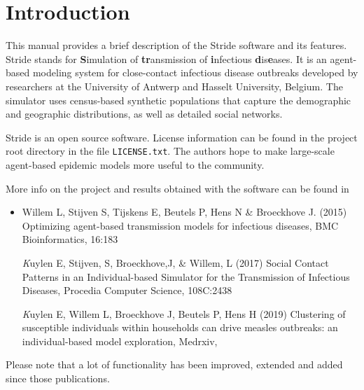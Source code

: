 \chapter{Introduction}
\label{chap:Introduction}
  
This manual provides a brief description of the Stride software and its
features. 
Stride stands for \textbf{S}imulation of \textbf{tr}ansmission 
 of \textbf{i}nfectious \textbf{d}is\textbf{e}ases. It is an agent-based modeling 
system for close-contact infectious disease outbreaks developed by researchers at the
University of Antwerp and Hasselt University, Belgium.
The simulator uses census-based synthetic populations
that capture the demographic and geographic distributions, as well as detailed social networks.

Stride is an open source software. License information can be found in the project root directory in the file \texttt{LICENSE.txt}. The authors hope to make large-scale
agent-based epidemic models more useful to the community.

More info on the project and results obtained with the software
can be found in
\begin{itemize}
\item Willem L, Stijven S, Tijskens E, Beutels P, Hens N \& Broeckhove J. (2015) Optimizing agent-based transmission models for infectious diseases, BMC Bioinformatics, 16:183 \cite{willem2015}
 
\textit Kuylen E, Stijven, S, Broeckhove,J, \& Willem, L (2017) Social Contact Patterns in an Individual-based Simulator for the Transmission of Infectious Diseases, Procedia Computer Science, 108C:2438 \cite{kuylen2017}

 \textit Kuylen E,  Willem L, Broeckhove J, Beutels P, Hens H (2019) Clustering of susceptible individuals within households can drive measles outbreaks: an individual-based model exploration, Medrxiv,  \cite{kuylen2019clustering}

\end{itemize}

Please note that a lot of functionality has been improved, extended and added since those publications.

